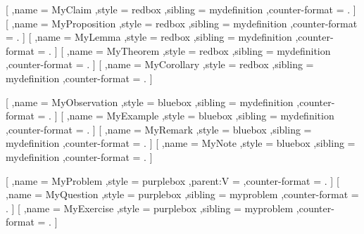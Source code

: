 {        %
        [
            ,name = MyClaim
            ,style = redbox
            ,sibling = mydefinition
            ,counter-format = .
        ]
        [
            ,name = MyProposition
            ,style = redbox
            ,sibling = mydefinition
            ,counter-format = .
        ]
        [
            ,name = MyLemma
            ,style = redbox
            ,sibling = mydefinition
            ,counter-format = .
        ]
        [
            ,name = MyTheorem
            ,style = redbox
            ,sibling = mydefinition
            ,counter-format = .
        ]
        [
            ,name = MyCorollary
            ,style = redbox
            ,sibling = mydefinition
            ,counter-format = .
        ]

        [
            ,name = MyObservation
            ,style = bluebox
            ,sibling = mydefinition
            ,counter-format = .
        ]
        [
            ,name = MyExample
            ,style = bluebox
            ,sibling = mydefinition
            ,counter-format = .
        ]
        [
            ,name = MyRemark
            ,style = bluebox
            ,sibling = mydefinition
            ,counter-format = .
        ]
        [
            ,name = MyNote
            ,style = bluebox
            ,sibling = mydefinition
            ,counter-format = .
        ]

        [
            ,name = MyProblem
            ,style = purplebox
            ,parent:V = \ProblemParent
            ,counter-format = .
        ]
        [
            ,name = MyQuestion
            ,style = purplebox
            ,sibling = myproblem
            ,counter-format = .
        ]
        [
            ,name = MyExercise
            ,style = purplebox
            ,sibling = myproblem
            ,counter-format = .
        ]
}